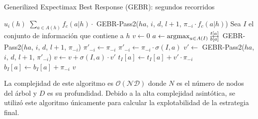\begin{algorithm}[H]
\caption{Generilized Expectimax Best Response (GEBR): segundos recorridos}
\label{algorithm:gebr-pass2}
\begin{algorithmic}[1]
            \State \Return $u_i(h)$
            \State \Return $\sum_{a \in A(h)} f_c(a|h) \cdot$ GEBR-Pass2($ha$, $i$, $d$, $l+1$, $\pi_{-i} \cdot f_c(a | h)$)
        \EndIf
        \State Sea $I$ el conjunto de información que contiene a $h$
        \State $v \leftarrow 0$
            \State $a \leftarrow \operatorname*{\arg\!\max}_{a \in A(I)} \frac{t[a]}{b[a]}$
            \State \Return GEBR-Pass2($ha$, $i$, $d$, $l+1$, $\pi_{-i}$)
        \EndIf
            \State $\pi'_{-i} \leftarrow \pi_{-i}$
                \State $\pi'_{-i} \leftarrow \pi_{-i} \cdot \sigma(I, a)$
            \EndIf
            \State $v' \leftarrow $ GEBR-Pass2($ha$, $i$, $d$, $l+1$, $\pi'_{-i}$)
                \State $v \leftarrow v + \sigma(I, a) \cdot v'$
                \State $t_I[a] \leftarrow t_I[a] + v' \cdot \pi_{-i}$
                \State $b_I[a] \leftarrow b_I[a] + \pi_{-i}$
            \EndIf
        \EndFor
        \State \Return $v$
    \EndFunction
\end{algorithmic}
\end{algorithm}

La complejidad de este algoritmo es $\mathcal{O(ND)}$ donde $N$ es el número de nodos del árbol y $D$ es su profundidad. Debido a la alta complejidad asintótica, se utilizó este algoritmo únicamente para calcular la explotabilidad de la estrategia final.
